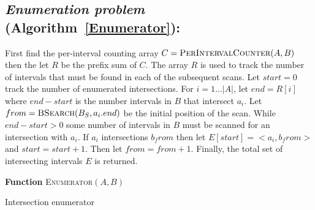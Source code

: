 \subsection{{\em Enumeration problem} (Algorithm~\ref{Enumerator}):} First find
the per-interval counting array
	 $C=\textsc{PerIntervalCounter}(A,B)$ then the let $R$ be the prefix sum
	 of $C$. The array $R$ is used to track the number of intervals that must be
	found in each of the subsequent scans.  Let $start = 0$ track the number of
	enumerated intersections.  For $i=1\dots|A|$, let $end = R[i]$ where $end -
	start$ is the number intervals in $B$ that intersect $a_i$.  Let
	$from=\textsc{BSearch}(B_S, a_i.end)$ be the initial position of the scan.
	While $end - start > 0$ some number of intervals in $B$ must be scanned for
	an intersection with $a_i$.  If $a_i$ intersections $b_from$ then let
	$E[start] = <a_i, b_from>$ and $start=start+1$.  Then let $from = from +1$.
	Finally, the total set of intersecting intervals $E$ is returned.\\
    
	 \begin{algorithm}[h!]
		   \DontPrintSemicolon
		   \footnotesize
		    
		   \BlankLine
		   \textbf{Function} \textsc{Enumerator}$(A,B)$
		   \caption{Intersection enumerator}
			\label{Enumerator}
	 \end{algorithm}

\pagebreak
